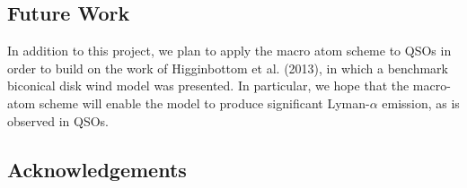 \documentclass[preprint, a4paper, 11pt]{aastex}
\begin{document}
\subsection{Future Work}

In addition to this project, we plan to apply the macro atom scheme to QSOs in order to build on the work of Higginbottom et al. (2013),
in which a benchmark biconical disk wind model was presented. In particular, we hope that the macro-atom scheme will enable the
model to produce significant Lyman-$\alpha$ emission, as is observed in QSOs.


\subsection*{Acknowledgements}



%
\end{document}
